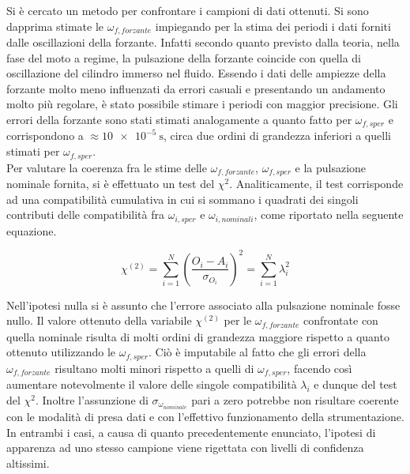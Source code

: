 \documentclass[a4paper,11pt,oneside]{article}
\begin{document}
Si è cercato un metodo per confrontare i campioni di dati ottenuti.
Si sono dapprima stimate le $\omega_{f, forzante}$ impiegando per la stima dei periodi i dati forniti dalle oscillazioni della forzante. Infatti secondo quanto previsto dalla teoria, nella fase del moto a regime, la pulsazione della forzante coincide con quella di oscillazione del cilindro immerso nel fluido. Essendo i dati delle ampiezze della forzante molto meno influenzati da errori casuali e presentando un andamento molto più regolare, è stato possibile stimare i periodi con maggior precisione. Gli errori della forzante sono stati stimati analogamente a quanto fatto per $\omega_{f, sper}$ e corrispondono a $\approx \SI{10e-5}{\second}$, circa due ordini di grandezza inferiori a quelli stimati per $\omega_{f, sper}$.\\

Per valutare la coerenza fra le stime delle $\omega_{f,forzante}$, $\omega_{f, sper}$ e la pulsazione nominale fornita, si è effettuato un test del $\chi^2$. Analiticamente, il test corrisponde ad una compatibilità cumulativa in cui si sommano i quadrati dei singoli contributi delle compatibilità fra $\omega_{i, sper}$ e $\omega_{i, nominali}$, come riportato nella seguente equazione.

\begin{equation*}
    \chi^{(2)}= \sum\limits_{i=1}^{N} \left(\frac{O_i - A_i}{\sigma_{O_i}} \right) ^2 = \sum\limits_{i=1}^{N} \lambda_{i}^2
\end{equation*}

Nell'ipotesi nulla si è assunto che l'errore associato alla pulsazione nominale fosse nullo. Il valore ottenuto della variabile $\chi^{(2)}$ per le $\omega_{f, forzante}$ confrontate con quella nominale risulta di molti ordini di grandezza maggiore rispetto a quanto ottenuto utilizzando le $\omega_{f, sper}$. 
Ciò è imputabile al fatto che gli errori della $\omega_{f, forzante}$ risultano molti minori rispetto a quelli di $\omega_{f, sper}$, facendo così aumentare notevolmente il valore delle singole compatibilità $\lambda_{i}$ e dunque del test del $\chi^2$. Inoltre l'assunzione di $\sigma_{\omega_{nominale}}$ pari a zero potrebbe non risultare coerente con le modalità di presa dati e con l'effettivo funzionamento della strumentazione.
In entrambi i casi, a causa di quanto precedentemente enunciato, l'ipotesi di apparenza ad uno stesso campione viene rigettata con livelli di confidenza altissimi.
\end{document}
